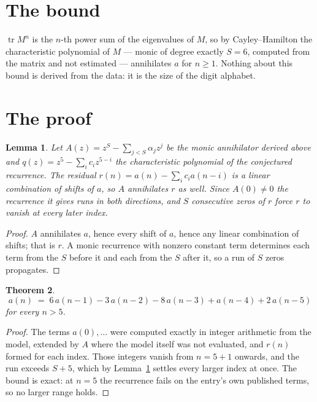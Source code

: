 \documentclass[11pt,a4paper]{article}
\theoremstyle{plain}
\newtheorem{theorem}{Theorem}
\newtheorem{lemma}[theorem]{Lemma}
\theoremstyle{definition}
\begin{document}
\section{The bound}

$\operatorname{tr}M^{n}$ is the $n$-th power sum of the eigenvalues of $M$, so by
Cayley--Hamilton the characteristic polynomial of $M$ --- monic of degree exactly $S=6$,
computed from the matrix and not estimated --- annihilates $a$ for $n\ge1$. Nothing about this
bound is derived from the data: it is the size of the digit alphabet.

\section{The proof}

\begin{lemma}\label{lem:crit}
Let $A(z)=z^S-\sum_{j<S}\alpha_jz^{j}$ be the monic annihilator derived above and
$q(z)=z^{5}-\sum_ic_iz^{5-i}$ the characteristic polynomial of the conjectured
recurrence. The residual $r(n)=a(n)-\sum_ic_ia(n-i)$ is a linear combination of shifts of $a$,
so $A$ annihilates $r$ as well. Since $A(0)\ne0$ the recurrence it gives runs in both
directions, and $S$ consecutive zeros of $r$ force $r$ to vanish at every later index.
\end{lemma}

\begin{proof}
$A$ annihilates $a$, hence every shift of $a$, hence any linear combination of shifts; that is
$r$. A monic recurrence with nonzero constant term determines each term from the $S$ before it
and each from the $S$ after it, so a run of $S$ zeros propagates.
\end{proof}

\begin{theorem}
\[
a(n)\;=\;6\,a(n-1) - 3\,a(n-2) - 8\,a(n-3) + a(n-4) + 2\,a(n-5)
\]
for every $n>5$.
\end{theorem}

\begin{proof}
The terms $a(0),\dots$ were computed exactly in integer arithmetic from the model, extended by
$A$ where the model itself was not evaluated, and $r(n)$ formed for each index. Those integers
vanish from $n=5+1$ onwards, and the run exceeds $S+5$, which by
Lemma~\ref{lem:crit} settles every larger index at once. The bound is exact: at $n=5$ the recurrence fails on the entry's own published terms, so no larger range holds.
\end{proof}
\end{document}
